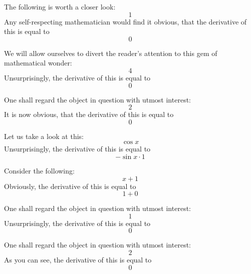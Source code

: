 \documentclass{article}
\begin{document}
The following is worth a closer look:
\begin{equation}
1 
\end{equation}
Any self-respecting mathematician would find it obvious, that the derivative of this is equal to
\begin{equation}
0 
\end{equation}

We will allow ourselves to divert the reader's attention to this gem of mathematical wonder:
\begin{equation}
4 
\end{equation}
Unsurprisingly, the derivative of this is equal to
\begin{equation}
0 
\end{equation}

One shall regard the object in question with utmost interest:
\begin{equation}
2 
\end{equation}
It is now obvious, that the derivative of this is equal to
\begin{equation}
0 
\end{equation}

Let us take a look at this:
\begin{equation}
\cos x 
\end{equation}
Unsurprisingly, the derivative of this is equal to
\begin{equation}
-\sin x \cdot 1 
\end{equation}

Consider the following:
\begin{equation}
x + 1 
\end{equation}
Obviously, the derivative of this is equal to
\begin{equation}
1 + 0 
\end{equation}

One shall regard the object in question with utmost interest:
\begin{equation}
1 
\end{equation}
Unsurprisingly, the derivative of this is equal to
\begin{equation}
0 
\end{equation}

One shall regard the object in question with utmost interest:
\begin{equation}
2 
\end{equation}
As you can see, the derivative of this is equal to
\begin{equation}
0 
\end{equation}
\end{document}
